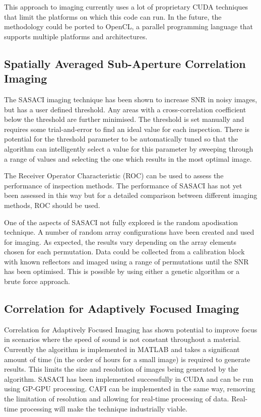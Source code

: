 This approach to imaging currently uses a lot of proprietary CUDA techniques that limit the platforms on which this code can run. In the future, the methodology could be ported to OpenCL, a parallel programming language that supports multiple platforms and architectures.

\subsection{Spatially Averaged Sub-Aperture Correlation Imaging}\label{sec:future_sasaci}
The SASACI imaging technique has been shown to increase SNR in noisy images, but has a user defined threshold. Any areas with a cross-correlation coefficient below the threshold are further minimised. The threshold is set manually and requires some trial-and-error to find an ideal value for each inspection. There is potential for the threshold parameter to be automatically tuned so that the algorithm can intelligently select a value for this parameter by sweeping through a range of values and selecting the one which results in the most optimal image.

The Receiver Operator Characteristic (ROC) can be used to assess the performance of inspection methods. The performance of SASACI has not yet been assessed in this way but for a detailed comparison between different imaging methods, ROC should be used\cite{van_pamel_methodology_2014}. 

One of the aspects of SASACI not fully explored is the random apodisation technique. A number of random array configurations have been created and used for imaging. As expected, the results vary depending on the array elements chosen for each permutation. Data could be collected from a calibration block with known reflectors and imaged using a range of permutations until the SNR has been optimised. This is possible by using either a genetic algorithm or a brute force approach. 

\subsection{Correlation for Adaptively Focused Imaging}
Correlation for Adaptively Focused Imaging has shown potential to improve focus in scenarios where the speed of sound is not constant throughout a material. Currently the algorithm is implemented in MATLAB and takes a significant amount of time (in the order of hours for a small image) is required to generate results. This limits the size and resolution of images being generated by the algorithm. SASACI has been implemented successfully in CUDA and can be run using GP-GPU processing. CAFI can be implemented in the same way, removing the limitation of resolution and allowing for real-time processing of data. Real-time processing will make the technique industrially viable.

